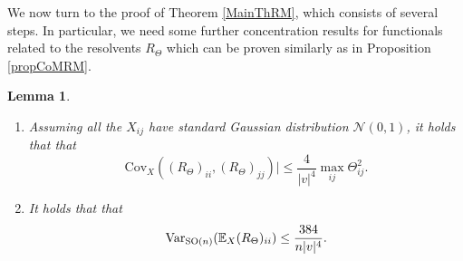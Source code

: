 \documentclass[a4paper,12pt]{amsart}
\numberwithin{equation}{section}
\newtheorem{lemma}[satz]{Lemma}
\theoremstyle{remark}
\def\E{{\mathbb E}}
\def\Var{{\rm Var}}
\begin{document}
We now turn to the proof of Theorem \ref{MainThRM}, which consists of several steps. In particular, we need some further concentration results for functionals related to the resolvents $R_\Theta$ which can be proven similarly as in Proposition \ref{propCoMRM}.

\begin{lemma}\label{lem:CovBdsSOn}
    \begin{enumerate}
        \item Assuming all the $X_{ij}$ have standard Gaussian distribution $\mathcal{N}(0,1)$, it holds that that
        \begin{equation*}
            \mathrm{Cov}_X((R_\Theta)_{ii}, (R_\Theta)_{jj})| \le \frac{4}{|v|^4}\max_{ij}\Theta_{ij}^2.
        \end{equation*}
        \item It holds that that
        \begin{equation*}
            \Var_{\mathrm{SO}(n)} (\E_X (R_\Theta)_{ii}) \le  \frac{384}{n |v|^4}.
        \end{equation*}
    \end{enumerate}
\end{lemma}
\end{document}
